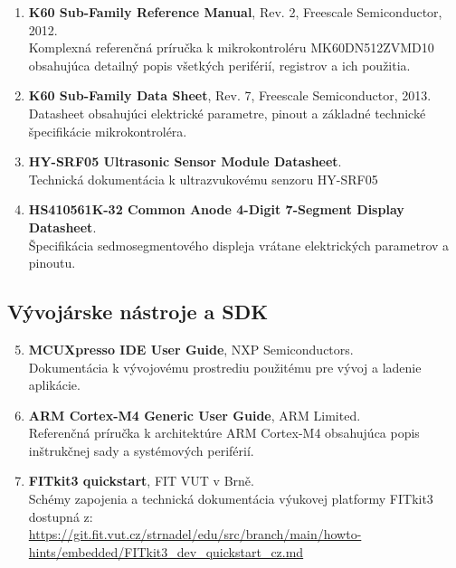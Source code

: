 \documentclass[11pt, a4paper,slovak]{article}
\begin{document}
\begin{enumerate}
    \item \textbf{K60 Sub-Family Reference Manual}, Rev. 2, Freescale Semiconductor, 2012. \\
    Komplexná referenčná príručka k mikrokontroléru MK60DN512ZVMD10 obsahujúca detailný popis všetkých periférií, registrov a ich použitia.
    
    \item \textbf{K60 Sub-Family Data Sheet}, Rev. 7, Freescale Semiconductor, 2013. \\
    Datasheet obsahujúci elektrické parametre, pinout a základné technické špecifikácie mikrokontroléra.
    
    \item \textbf{HY-SRF05 Ultrasonic Sensor Module Datasheet}. \\
    Technická dokumentácia k ultrazvukovému senzoru HY-SRF05
    
    \item \textbf{HS410561K-32 Common Anode 4-Digit 7-Segment Display Datasheet}. \\
    Špecifikácia sedmosegmentového displeja vrátane elektrických parametrov a pinoutu.
\end{enumerate}

\subsection{Vývojárske nástroje a SDK}

\begin{enumerate}
    \setcounter{enumi}{4}
    \item \textbf{MCUXpresso IDE User Guide}, NXP Semiconductors. \\
    Dokumentácia k vývojovému prostrediu použitému pre vývoj a ladenie aplikácie.
    
    \item \textbf{ARM Cortex-M4 Generic User Guide}, ARM Limited. \\
    Referenčná príručka k architektúre ARM Cortex-M4 obsahujúca popis inštrukčnej sady a systémových periférií.
    
    \item \textbf{FITkit3 quickstart}, FIT VUT v Brně. \\
    Schémy zapojenia a technická dokumentácia výukovej platformy FITkit3 dostupná z: \\
    \url{https://git.fit.vut.cz/strnadel/edu/src/branch/main/howto-hints/embedded/FITkit3_dev_quickstart_cz.md}
\end{enumerate}
\end{document}
